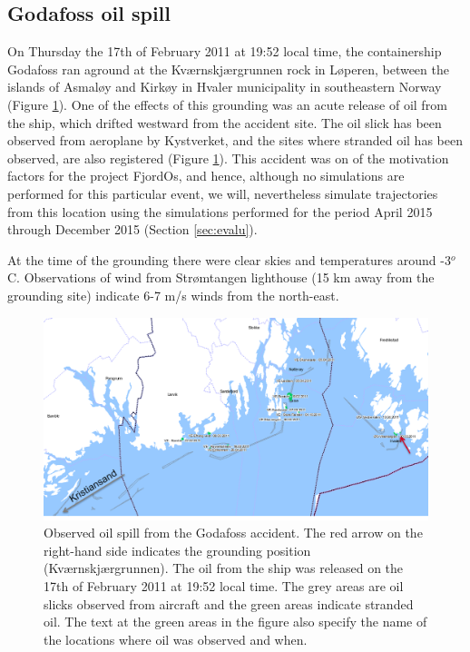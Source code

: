 \subsection{Godafoss oil spill}
\label{sect:godafoss_obs}
On Thursday the 17th of February 2011 at 19:52 local time, the containership Godafoss ran aground at the Kv{\ae}rnskj{\ae}rgrunnen rock in L{\o}peren, between the islands of Asmal{\o}y and Kirk{\o}y in Hvaler municipality in southeastern Norway (Figure \ref{fig:godafoss_oil}). One of the effects of this grounding was an acute release of oil from the ship, which drifted westward from the accident site. The oil slick has been observed from aeroplane by Kystverket, and the sites where stranded oil has been observed, are also registered (Figure \ref{fig:godafoss_oil}). This accident was on of the motivation factors for the project FjordOs, and hence, although no simulations are performed for this particular event, we will, nevertheless simulate trajectories from this location using the simulations performed for the period April 2015 through December 2015 (Section \ref{sec:evalu}). 

At the time of the grounding there were clear skies and temperatures around -3$^o$C. Observations of wind from Str{\o}mtangen lighthouse (15 km away from the grounding site) indicate 6-7 m/s winds from the north-east.

\begin{figure}[ht]
\centerline{
\includegraphics*[width=\textwidth]{Figurer/Godafoss}
}
\caption{\small
Observed oil spill from the Godafoss accident. The red arrow on the right-hand side indicates the grounding position (Kv{\ae}rnskj{\ae}rgrunnen). The oil from the ship was released on the 17th of February 2011 at 19:52 local time. The grey areas are oil slicks observed from aircraft and the green areas indicate stranded oil. The text at the green areas in the figure also specify the name of the locations where oil was observed and when.}
\label{fig:godafoss_oil}
\end{figure}


\newpage
\clearpage
